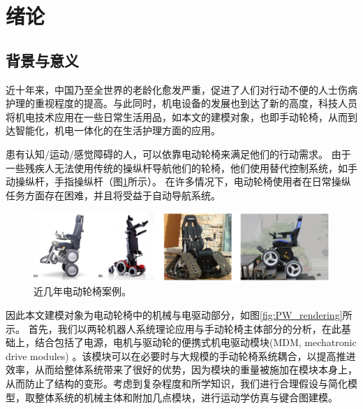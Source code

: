 \newpage
\setcounter{page}{1}
\cfoot{\thepage}

\section{绪论}
\subsection{背景与意义}

近十年来，中国乃至全世界的老龄化愈发严重，促进了人们对行动不便的人士伤病护理的重视程度的提高。与此同时，机电设备的发展也到达了新的高度，科技人员将机电技术应用在一些日常生活用品，如本文的建模对象，也即手动轮椅，从而到达智能化，机电一体化的在生活护理方面的应用。

患有认知/运动/感觉障碍的人，可以依靠电动轮椅来满足他们的行动需求。 由于一些残疾人无法使用传统的操纵杆导航他们的轮椅，他们使用替代控制系统，如手动操纵杆，手指操纵杆（图\ref{fig:smart_wheel_chairs}所示）。 在许多情况下，电动轮椅使用者在日常操纵任务方面存在困难，并且将受益于自动导航系统。

\begin{figure}[!h]
	\centering
	\includegraphics[width=1\textwidth]{fig/smart_wheel_chairs.png}
	\caption{近几年电动轮椅案例。}\label{fig:smart_wheel_chairs}
\end{figure}

因此本文建模对象为电动轮椅中的机械与电驱动部分，如图\ref{fig:PW_rendering}所示。
首先，我们以两轮机器人系统理论应用与手动轮椅主体部分的分析，在此基础上，结合包括了电源，电机与驱动轮的便携式机电驱动模块(MDM, mechatronic drive modules) 。该模块可以在必要时与大规模的手动轮椅系统耦合，以提高推进效率，从而给整体系统带来了很好的优势，因为模块的重量被施加在模块本身上，从而防止了结构的变形。考虑到复杂程度和所学知识，我们进行合理假设与简化模型，取整体系统的机械主体和附加几点模块，进行运动学仿真与键合图建模。

